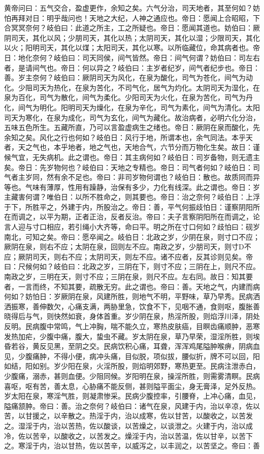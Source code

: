 \documentclass[a4paper,12pt,UTF8,twoside]{ctexbook}
\begin{document}
黄帝问曰：五气交合，盈虚更作，余知之矣。六气分治，司天地者，其至何如？妨怕再拜对日：明乎哉问也！天地之大纪，人神之通应也。帝日：愿闻上合昭昭，下合冥冥奈何？岐伯曰：此道之所主，工之所疑也。帝日：愿闻其道也。妨伯曰：厥阴司天，其化以风；少朋司天，其化以热；太阴司天，其化以湿；少限司天，其化以火；阳明司天，其化以煤；太阳司天，其化以寒。以所临藏位，命其病者也。帝日：地化奈何？岐伯曰：司天同侯，间气皆然。帝日：间气何谓？妨伯曰：司左右者，是请间气也。帝日：何以异之？岐伯曰：主岁者纪岁，间气者纪步也。帝日：善。岁主奈何？岐伯曰：厥阴司天为风化，在泉为酸化，司气为苍化，间气为动化。少阻司天为热化，在泉为苦化，不司气化，居气为灼化。太阴司天为湿化，在泉为百化，司气为散化，间气为柔化。少阳司天为火化，在泉为苦化，司气为丹化，间气为明化。阳明司天为燥化，在泉为辛化，司气为素化，间气为清化。太阳司天为寒化，在泉为成化，司气为玄化，间气为藏化。故治病者，必明六化分治，五味五色所生。五藏所直，乃可以言盈虚病生之绪也。帝日：厥阴在泉而酸化，先余知之矣。风化之行也何如？岐伯日：风行于地，所谓本也，余气同法。本乎天者，天之气也，本乎地者，地之气也，天地合气，六节分而万物化生矣。故日：谨候气宜，无失病机。此之谓也。帝日：其主病何如？岐伯日：司岁备物，则无遗主矣。帝日：先岁物何也？岐伯曰：天地之专精也。帝日：司气者何如？岐伯日：司气者主岁同，然有余不足也。帝曰：非司岁物何谓也？岐伯日：散也。故质同而异等也。气味有薄厚，性用有躁静，治保有多少，力化有线深。此之谓也。帝日：岁主藏害何谓？唯伯日：以所不胜命之，则其要也。帝日：治之奈何？岐伯日：上浮于下，所胜平之，外建于内，所股治之。帝日：善，平气何振歧怕日：谨察阴阳所在而调之，以平为期，正者正治，反者反治。帝曰：夫子言察阴阳所在而调之，论言人迎与寸口相应，若引绳小大齐等，命曰平。明之所在寸口何如？歧怕曰：砚岁南北，可知之矣。帝曰：愿卒闻之。岐伯日：北政之岁，少阴在泉，则寸口不应；厥阴在泉，则右不应；太阴在泉，回则左不应。南政之岁，少朋司天，则寸D不应；厥阴司天，则右不应；太阴司天，则左不应。诸不应者，反其诊则见矣。帝曰：尺候何如？岐伯曰：北政之岁，三阴在下，则寸不应；三阴在上，则尺不应。南政之岁，三明在天，则寸不应；三阴在泉，则尺不应。左右同。故日：知其要者，一言而终，不知其要，疏散无穷。此之谓也。帝曰：善。天地之气，内建而病何如？妨怕日：岁厥阴在泉，风建所胜，则地气不明，平野味，草乃早秀。民病洒洒振寒，善伸数欠，心痛支满，两胁里急，饮食不下，见咽不通，食则呕，腹胀善晓得后与气，则快然如衰，身体首重。岁少阴在泉，热淫所股，则焰浮川泽，阴处反明。民病腹中常鸣，气上冲胸，喘不能久立，寒热皮肤癌，目瞑齿痛顺肿，恶寒发热加疟，少腹中痛，腹大，蛰虫不藏。岁太阴在泉，草乃早荣，湿淫所胜，则埃昏若谷，黄反见黑，至阴之交。民病饮积心痛，耳聋，浑浑鸡尾隘肿喉痹，阴病血见，少腹痛肿，不得小便，病冲头痛，目似脱，项似拔，腰似折，牌不可以回，阳如结，阳如别。岁少阳在泉，火淫所股，则焰明郊野，寒热更至。民病注泄赤白，少腹痛，溺赤，甚则血便。少阻同候。岁阳明在泉，操淫所胜，则需雾清瞑。民病喜呕，呕有苦，善太息，心胁痛不能反侧，甚则隘平面尘，身无膏泽，足外反热。岁太阳在泉，寒淫气胜，则凝肃惨采。民病少腹控率，引腰脊，上冲心痛，血见，隘痛颔肿。帝曰：善。治之奈何？岐伯曰：诸气在泉，风建于内，治以辛凉，佐以苦，以甘援之，以辛散之。热淫于内，治以成寒，佐以甘苦，以酸收之，以苦发之。湿淫于内，治以苦热，佐以酸谈，以苦燥之，以谈泄之。火建于内，治以成冷，佐以苦辛，以酸收之，以苦发之。燥淫于内，治以苦温，佐以甘辛，以苦下之。寒淫于内，治以甘热，佐以苦辛，以威泻之，以丰润之，以苦坚之。帝曰：善
\end{document}

